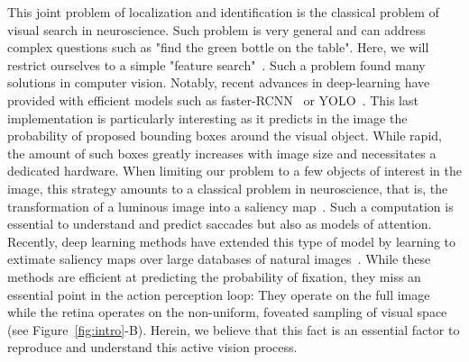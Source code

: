 \CNS
This joint problem of localization and identification is the classical problem of visual search in neuroscience. Such problem is very general and can address complex questions such as "find the green bottle on the table". Here, we will restrict ourselves to a simple "feature search"~\citep{Treisman80}. Such a problem found many solutions in computer vision. Notably, recent advances in deep-learning have provided with efficient models such as faster-RCNN~\citep{Ren17} or YOLO~\citep{Redmon15}. This last implementation is particularly interesting as it predicts in the image the probability of proposed bounding boxes around the visual object. While rapid, the amount of such boxes greatly increases with image size and necessitates a dedicated hardware. When limiting our problem to a few objects of interest in the image, this strategy amounts to a classical problem in neuroscience, that is, the transformation of a luminous image into a saliency map~\citep{Itti01}. Such a computation is essential to understand and predict saccades but also as models of attention. Recently, deep learning methods have extended this type of model by learning to extimate saliency maps over large databases of natural images~\citep{Kummerer16}. While these methods are efficient at predicting the probability of fixation, they miss an essential point in the action perception loop: They operate on the full image while the retina operates on the non-uniform, foveated sampling of visual space (see Figure~\ref{fig:intro}-B). Herein, we believe that this fact is an essential factor to reproduce and understand this active vision process.


